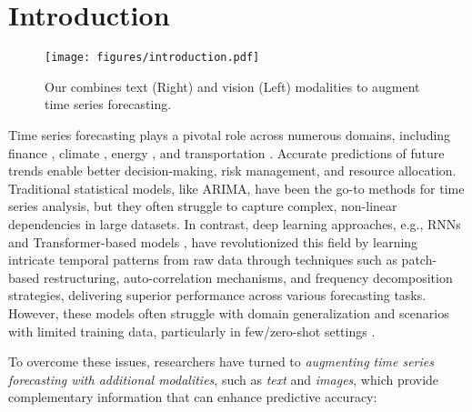 \section{Introduction}

\begin{figure}[t!]
    \centering    
    \texttt{[image: figures/introduction.pdf]}
    \caption{Our \method combines text (Right) and vision (Left) modalities to augment time series forecasting.}
    \label{fig:intro}
    \vspace{-1.5em}
\end{figure}

Time series forecasting plays a pivotal role across numerous domains, including finance \cite{idrees2019prediction}, climate \cite{karevan2020transductive}, energy \cite{deb2017review}, and transportation \cite{zheng2020traffic}. Accurate predictions of future trends enable better decision-making, risk management, and resource allocation. Traditional statistical models, like ARIMA, have been the go-to methods for time series analysis, but they often struggle to capture complex, non-linear dependencies in large datasets. In contrast, deep learning approaches, e.g., RNNs \cite{medsker2001recurrent} and Transformer-based models \cite{li2019logtrans,wu2021autoformer,zhou2021informer,liu2022pyraformer,zhou2022fedformer,nie2022time}, have revolutionized this field by learning intricate temporal patterns from raw data through techniques such as patch-based restructuring, auto-correlation mechanisms, and frequency decomposition strategies, delivering superior performance across various forecasting tasks. However, these models often struggle with domain generalization and scenarios with limited training data, particularly in few/zero-shot settings \cite{liang2024foundation}.

To overcome these issues, researchers have turned to \emph{augmenting time series forecasting with additional modalities}, such as \emph{text} and \emph{images}, which provide complementary information that can enhance predictive accuracy:

\vspace{-1em}

